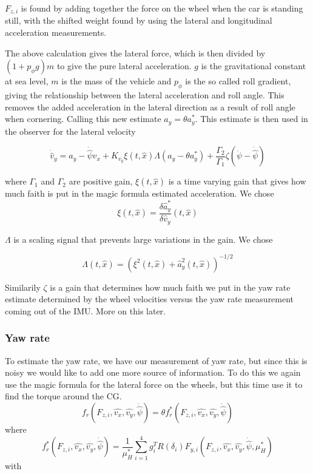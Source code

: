 $F_{z,i}$ is found by adding together the force on the wheel when the car is standing still, with the shifted weight found by using the lateral and longitudinal acceleration measurements.  

The above calculation gives the lateral force, which is then divided by $(1 + p_{\phi}g)m$ to give the pure lateral acceleration. $g$ is the gravitational constant at sea level, $m$ is the mass of the vehicle and $p_{\phi}$ is the so called roll gradient, giving the relationship between the lateral acceleration and roll angle. This removes the added acceleration in the lateral direction as a result of roll angle when cornering. Calling this new estimate $a_y = \theta a_y^*$. This estimate is then used in the observer for the lateral velocity

\begin{equation}
    \dot{\hat{v}}_y = a_y - \dot{\hat{\psi}}\hat{v}_x + K_{v_y}\xi(t,\hat{x})\Lambda(a_y - \theta a_y^{*}) + \frac{\Gamma_2}{\Gamma_1}\zeta(\dot{\psi} - \dot{\hat{\psi}})
\end{equation}

where $\Gamma_1$ and $\Gamma_2$ are positive gain, $\xi(t,\hat{x})$ is a time varying gain that gives how much faith is put in the magic formula estimated acceleration. We chose
\begin{equation}
    \xi(t,\hat{x}) = \frac{\delta \hat{a}_y^*}{\delta \hat{v}_y}(t,\hat{x})
\end{equation}

$\Lambda$ is a scaling signal that prevents large variations in the gain. We chose

\begin{equation}
    \Lambda(t,\hat{x}) = (\xi^2(t,\hat{x}) + \hat{a}_y^2(t,\hat{x}))^{-1/2}
\end{equation}

Similarily $\zeta$ is a gain that determines how much faith we put in the yaw rate estimate determined by the wheel velocities versus the yaw rate measurement coming out of the IMU. More on this later. 

\subsubsection{Yaw rate}

To estimate the yaw rate, we have our measurement of yaw rate, but since this is noisy we would like to add one more source of information. To do this we again use the magic formula for the lateral force on the wheels, but this time use it to find the torque around the CG.
\begin{equation}
    f_r(F_{z,i}, \hat{v_x}, \hat{v_y}, \dot{\hat{\psi}}) =\theta f_r^*(F_{z,i}, \hat{v_x}, \hat{v_y}, \dot{\hat{\psi}}) 
\end{equation}
where
\begin{equation}
    f_r^*(F_{z,i}, \hat{v_x}, \hat{v_y}, \dot{\hat{\psi}}) = \frac{1}{\mu_H^*}\sum_{i=1}^{4}g_i^TR(\delta_i)F_{y,i}(F_{z,i}, \hat{v_x}, \hat{v_y}, \dot{\hat{\psi}}, \mu_H^*)
\end{equation}
with 


